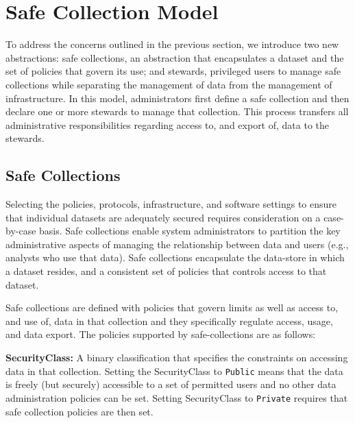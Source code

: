 \section{Safe Collection Model}
\label{sec:architecture}


To address the concerns outlined in the previous section, we introduce two
new abstractions: safe collections, an abstraction that encapsulates
a dataset and the set of policies that govern its use; and stewards, privileged users
to manage safe collections while separating the management of data from the management of infrastructure.
In this model, administrators first define a safe collection and then declare one
or more stewards to manage that collection. This process transfers
all administrative responsibilities regarding access to, and export of, data to the stewards.

\subsection{Safe Collections}

Selecting the policies, protocols, infrastructure, and
software settings to ensure that individual datasets are adequately secured requires consideration
on a case-by-case basis.
Safe collections enable system administrators to partition the key administrative
aspects of managing the relationship between data and users (e.g., analysts who use that data).
Safe collections encapsulate the data-store in which a dataset resides, and a consistent set of policies
that controls access to that dataset.

Safe collections are defined with policies that govern limits as well as access to, and use of,
data in that collection and they specifically regulate access, usage, and data export.
The policies supported by safe-collections are as follows:

\textbf{SecurityClass:} A binary classification that specifies the constraints
on accessing data in that collection. Setting the SecurityClass to \texttt{Public} means that the data is freely
(but securely) accessible to a set of permitted users and no other
data administration policies can be set.  Setting SecurityClass to \texttt{Private}
requires that safe collection policies are then set.

